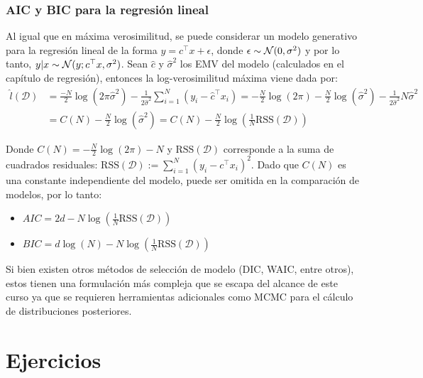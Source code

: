 \newpage

\subsubsection{AIC y BIC para la regresión lineal}

Al igual que en máxima verosimilitud, se puede considerar un modelo generativo para la regresión lineal de la forma $ y = c^\top x + \epsilon$, donde $\epsilon\sim{\mathcal N}(0,\sigma^2)$ y por lo tanto, $y|x \sim {\mathcal N}(y;c^\top x,\sigma^2)$. Sean $\hat{c}$ y $\hat{\sigma}^2$ los EMV del modelo (calculados en el capítulo de regresión), entonces la log-verosimilitud máxima viene dada por:
\begin{align}
	\hat{l}(\mathcal{D}) &= \frac{-N}{2}\log(2\pi\hat{\sigma}^2) - \frac{1}{2\hat{\sigma}^2} \sum_{i=1}^N( y_i-\hat{c}^\top x_i)= -\frac{N}{2}\log(2\pi) - \frac{N}{2}\log(\hat{\sigma}^2) - \frac{1}{2\hat{\sigma}^2}  N\hat{\sigma}^2\\
	&= C(N) - \frac{N}{2}\log(\hat{\sigma}^2) = C(N)- \frac{N}{2}\log\left(\frac{1}{N}\text{RSS}(\mathcal{D})\right)
\end{align}	

Donde $C(N) = -\frac{N}{2}\log(2\pi) - N$ y $\text{RSS}(\mathcal{D})$ corresponde a la suma de cuadrados residuales: $\text{RSS}(\mathcal{D}) := \sum_{i=1}^N \left(y_i - c^\top x_i\right)^2$. Dado que $C(N)$ es una constante independiente del modelo, puede ser omitida en la comparación de modelos, por lo tanto:

\begin{itemize}
	\item $AIC=2d-N\log(\frac{1}{N}\text{RSS}(\mathcal{D}))$
	\item $BIC = d\log(N) - N\log(\frac{1}{N}\text{RSS}(\mathcal{D}))$
\end{itemize}

Si bien existen otros métodos de selección de modelo (DIC, WAIC, entre otros), estos tienen una formulación más compleja que se escapa del alcance de este curso ya que se requieren herramientas adicionales como MCMC para el cálculo de distribuciones posteriores.



\section{Ejercicios}

